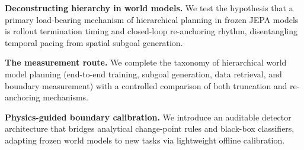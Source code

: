 \documentclass[11pt]{article}
\begin{document}
\textbf{Deconstructing hierarchy in world models.} We test the hypothesis that a primary load-bearing mechanism of hierarchical planning in frozen JEPA models is rollout termination timing and closed-loop re-anchoring rhythm, disentangling temporal pacing from spatial subgoal generation.

\textbf{The measurement route.} We complete the taxonomy of hierarchical world model planning (end-to-end training, subgoal generation, data retrieval, and boundary measurement) with a controlled comparison of both truncation and re-anchoring mechanisms.

\textbf{Physics-guided boundary calibration.} We introduce an auditable detector architecture that bridges analytical change-point rules and black-box classifiers, adapting frozen world models to new tasks via lightweight offline calibration.



\end{document}

